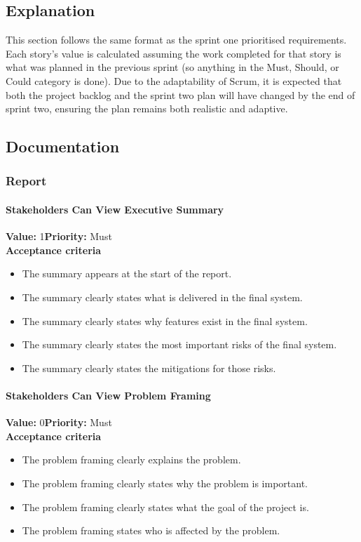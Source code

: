 \subsection{Explanation}
This section follows the same format as the sprint one prioritised requirements. Each story's value is calculated assuming the work completed for that story is what was planned in the previous sprint (so anything in the Must, Should, or Could category is done). Due to the adaptability of Scrum, it is expected that both the project backlog and the sprint two plan will have changed by the end of sprint two, ensuring the plan remains both realistic and adaptive.

\subsection{Documentation}

\subsubsection{Report}

\paragraph{Stakeholders Can View Executive Summary}
\textbf{Value:} 1\quad \textbf{Priority:} Must\\
\textbf{Acceptance criteria}
\begin{itemize}
  \item The summary appears at the start of the report.
  \item The summary clearly states what is delivered in the final system.
  \item The summary clearly states why features exist in the final system.
  \item The summary clearly states the most important risks of the final system.
  \item The summary clearly states the mitigations for those risks.
\end{itemize}

\paragraph{Stakeholders Can View Problem Framing}
\textbf{Value:} 0\quad \textbf{Priority:} Must\\
\textbf{Acceptance criteria}
\begin{itemize}
  \item The problem framing clearly explains the problem.
  \item The problem framing clearly states why the problem is important.
  \item The problem framing clearly states what the goal of the project is.
  \item The problem framing states who is affected by the problem.
\end{itemize}

